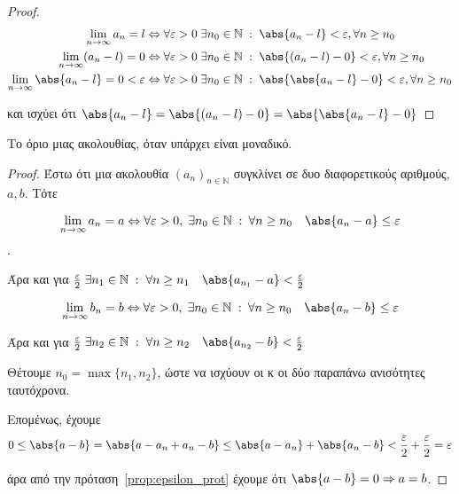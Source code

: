 \documentclass[main.tex]{subfiles}
\begin{document}
\begin{proof}
\item {}
    \begin{align*} \lim_{n \to \infty} a_{n}= l & \Leftrightarrow \forall \varepsilon > 0 
    \; \exists n_{0} \in \mathbb{N} \; : \; \abs{a_{n}-l} < \varepsilon, 
    \forall n \geq n_{0} \\ 
    \lim_{n \to \infty} (a_{n}-l) = 0 & \Leftrightarrow \forall \varepsilon >0 \; \exists n_{0} 
    \in \mathbb{N} 
    \; : \; \abs { (a_{n}-l) - 0} < \varepsilon , \forall n \geq n_{0} \\
    \lim_{n \to \infty} \abs{a_{n}-l}=0 < \varepsilon & \Leftrightarrow \forall \varepsilon > 0 \; 
    \exists n_{0} \in \mathbb{N} 
    \; : \; \abs {\abs{a_{n}- l } - 0} < \varepsilon, \forall n \geq n_{0} 
\end{align*}

και ισχύει ότι $ \abs{a_{n}-l} = \abs{(a_{n}-l)-0} = \abs{\abs{a_{n}- l} -0} $
\end{proof}

\begin{thm}
    Το όριο μιας ακολουθίας, όταν υπάρχει είναι μοναδικό.
\end{thm}

\begin{proof}
    Έστω ότι μια ακολουθία $ (a_{n})_{n \in \mathbb{N}} $ συγκλίνει σε δυο 
    διαφορετικούς αριθμούς, $ a,b $. Τότε

    \[ \lim_{n \to \infty} a_{n} = a \Leftrightarrow \forall \varepsilon > 0, 
        \; \exists n_{0} \in \mathbb{N} \; : \: \forall n \geq n_{0} \quad 
    \abs{a_{n}- a} \leq \varepsilon \].

    Άρα και για $ \frac{\varepsilon}{2} \; \exists n_{1} \in \mathbb{N} \; : \; \forall 
    n \geq n_{1} \quad \abs{a_{n_{1}} - a} < \frac{\varepsilon}{ 2}  $

    \[ \lim_{n \to \infty} b_{n} = b \Leftrightarrow \forall \varepsilon > 0, 
        \; \exists n_{0} \in \mathbb{N} \; : \: \forall n \geq n_{0} \quad 
    \abs{a_{n}- b} \leq \varepsilon \]

    Άρα και για $ \frac{\varepsilon}{2} \; \exists n_{2} \in \mathbb{N} \; : \; \forall 
    n \geq n_{2}  \quad \abs{a_{n_{2}} - b} < \frac{\varepsilon}{ 2}  $

    Θέτουμε $ n_{0} = \max \{ n_{1}, n_{2} \} $, ώστε να ισχύουν οι κ οι δύο παραπάνω 
    ανισότητες ταυτόχρονα. 

    Επομένως, έχουμε 
    \[
        0 \leq \abs{a-b} = \abs{a- a_{n}+ a_{n}- b} \leq \abs{a- a_{n}} + \abs{
        a_{n}- b} < \frac{\varepsilon}{2} + \frac{\varepsilon}{2} = \varepsilon 
     \] 

     άρα από την πρόταση~\ref{prop:epsilon_prot} έχουμε ότι $ \abs{a-b} = 0 \Rightarrow a=b $.
\end{proof}
\end{document}

